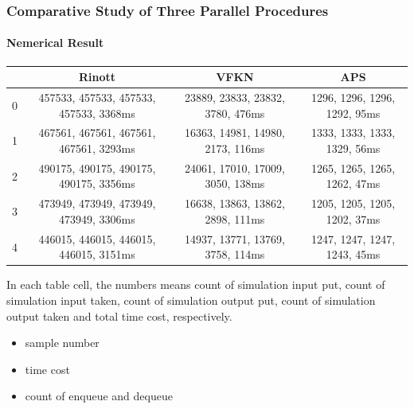 \documentclass{beamer}
\begin{document}
\begin{frame}
\frametitle{Comparative Study of Three Parallel Procedures}
\framesubtitle{Nemerical Result}
\begin{table}[ht]
\begin{center}
\scalebox{0.6}
{
\begin{tabular}{|c|c|c|c|}
\hline
& Rinott & VFKN & APS \\
\hline
0 & 457533, 457533, 457533, 457533, 3368ms & 23889, 23833, 23832, 3780, 476ms & 1296, 1296, 1296, 1292, 95ms \\
\hline
1 & 467561, 467561, 467561, 467561, 3293ms & 16363, 14981, 14980, 2173, 116ms & 1333, 1333, 1333, 1329, 56ms \\
\hline
2 & 490175, 490175, 490175, 490175, 3356ms & 24061, 17010, 17009, 3050, 138ms & 1265, 1265, 1265, 1262, 47ms \\
\hline
3 & 473949, 473949, 473949, 473949, 3306ms & 16638, 13863, 13862, 2898, 111ms & 1205, 1205, 1205, 1202, 37ms \\
\hline
4 & 446015, 446015, 446015, 446015, 3151ms & 14937, 13771, 13769, 3758, 114ms & 1247, 1247, 1247, 1243, 45ms \\
\hline
\end{tabular}
}
\end{center}
\end{table}
{\tiny In each table cell, the numbers means count of simulation input put, count of simulation input taken, count of simulation output put, count of simulation output taken and total time cost, respectively.}
\begin{itemize}
\item sample number
\item time cost
\item count of enqueue and dequeue
\end{itemize}
\end{frame}
\end{document}
